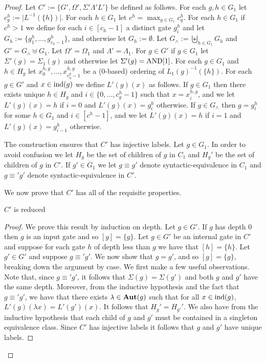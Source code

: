 \documentclass[../main/thesis.tex]{subfiles}
\begin{document}
\begin{proof}
  Let $C' := \{G', \Omega', \Sigma' \Lambda' L'\}$ be defined as follows. For
  each $g, h \in G_1$ let $c^h_g := \vert L^{-1}(\{h\}) \vert$. For each $h \in
  G_1$ let $c^h = \max_{g \in G_1} c^h_g$. For each $h \in G_1$ if $c^h > 1$ we
  define for each $i \in [c_h-1]$ a distinct gate $g^h_i$ and let $G_h :=
  \{g^{h}_{1}, \ldots, g^h_{c_h-1}\}$, and otherwise let $G_h := \emptyset$. Let
  $G_{\land} := \biguplus_{h \in G_1} G_h$ and $G' = G_{\land} \uplus G_1$. Let
  $\Omega' = \Omega_1$ and $\Lambda' = \Lambda_1$. For $g \in G'$ if $g \in G_1$
  let $\Sigma'(g) = \Sigma_1(g)$ and otherwise let $\Sigma'(g) = \text{\upshape AND}[1]$. For
  each $g \in G_1$ and $h \in H_g$ let $x^{h,g}_0, \ldots, x^{h,g}_{c^g_h - 1}$
  be a ($0$-based) ordering of $L_1(g)^{-1}(\{h\})$. For each $g \in G'$ and $x
  \in \text{\upshape ind}(g)$ we define $L'(g)(x)$ as follows. If $g \in G_1$ then there exists
  unique $h \in H_g$ and $i \in \{0, \ldots, c^h_g - 1\}$ such that $x =
  x^{h,g}_i$, and we let $L'(g)(x) = h$ if $i = 0$ and $L'(g) (x) = g^h_i$
  otherwise. If $g \in G_{\land}$ then $g = g^h_i$ for some $h \in G_1$ and $i
  \in [c^h-1]$, and we let $L'(g)(x) = h$ if $i = 1$ and $L'(g)(x) = g^h_{i-1}$
  otherwise.

  The construction ensures that $C'$ has injective labels. Let $g \in G_1$. In
  order to avoid confusion we let $H_g$ be the set of children of $g$ in $C_1$
  and $H_g'$ be the set of children of $g$ in $C'$. If $g' \in G_1$ we let $g
  \equiv g'$ denote syntactic-equivalence in $C_1$ and $g \equiv' g'$ denote
  syntactic-equivalence in $C'$.

  We now prove that $C'$ has all of the requisite properties.
  
  \begin{claim}
    $C'$ is reduced
  \end{claim}
  \begin{proof}
    We prove this result by induction on depth. Let $g \in G'$. If $g$ has depth
    $0$ then $g$ is an input gate and so $[g] = \{g\}$. Let $g \in G'$ be an
    internal gate in $C'$ and suppose for each gate $h$ of depth less than $g$
    we have that $[h] = \{ h \}$. Let $g' \in G'$ and suppose $g \equiv' g'$. We
    now show that $g = g'$, and so $[g] = \{g\}$, breaking down the argument by
    case. We first make a few useful observations. Note that, since $g \equiv'
    g'$, it follows that $\Sigma (g) = \Sigma(g')$ and both $g$ and $g'$ have
    the same depth. Moreover, from the inductive hypothesis and the fact that $g
    \equiv' g'$, we have that there exists $\lambda \in \text{\textbf{Aut}}(g)$ such that for
    all $x \in \text{\upshape ind}(g)$, $L'(g) (\lambda x) = L'(g')(x)$. It follows that
    $H_{g}' = H_{g'}'$. We also have from the inductive hypothesis that each
    child of $g$ and $g'$ must be contained in a singleton equivalence class.
    Since $C'$ has injective labels it follows that $g$ and $g'$ have unique
    labels.


\end{proof}
\end{proof}
\end{document}
